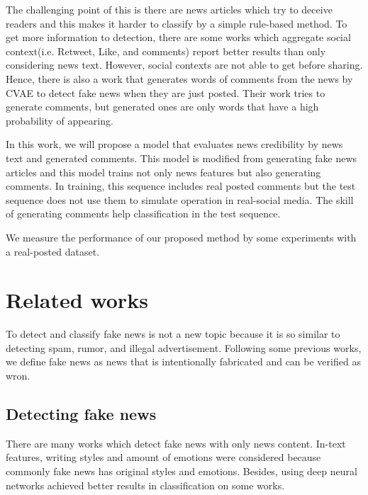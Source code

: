 \documentclass[conference]{IEEEtran}
\begin{document}
The challenging point of this is there are news articles which try to deceive readers
and this makes it harder to classify by a simple rule-based method.
To get more information to detection,
there are some works which aggregate social context(i.e. Retweet, Like, and comments)
report better results than only considering news text\cite{Guo:2018:RDH:3269206.3271709}.
However, social contexts are not able to get before sharing.
Hence, there is also a work that generates words of comments from the news by CVAE to detect fake news when they are just posted\cite{ijcai2018-533}.
Their work tries to generate comments, but generated ones are only words that have a high probability of appearing.

In this work, we will propose a model that evaluates news credibility by news text and generated comments.
This model is modified from generating fake news articles\cite{NIPS2019_9106} and this model trains not only news features but also generating comments.
In training, this sequence includes real posted comments but the test sequence does not use them to simulate operation in real-social media.
The skill of generating comments help classification in the test sequence.

We measure the performance of our proposed method by some experiments with a real-posted dataset.

\section{Related works}
To detect and classify fake news is not a new topic because it is so similar to detecting spam\cite{shen2017discovering}, rumor\cite{7023340}, and illegal advertisement\cite{Huang:2017:DFO:3041021.3054233}.
Following some previous works\cite{Shu:2017:FND:3137597.3137600,Ruchansky:2017:CHD:3132847.3132877,Wang:2018:EEA:3219819.3219903}, we define fake news as news that is intentionally fabricated and can be verified as wron.

\subsection{Detecting fake news}
There are many works which detect fake news with only news content.
In-text features, writing styles\cite{DBLP:journals/corr/PotthastKRBS17} and amount of emotions\cite{DBLP:journals/corr/abs-1903-01728}
were considered because commonly fake news has original styles and emotions.
Besides, using deep neural networks achieved better results in classification on some works\cite{wang-2017-liar,karimi-tang-2019-learning,karimi-etal-2018-multi}.
\end{document}
